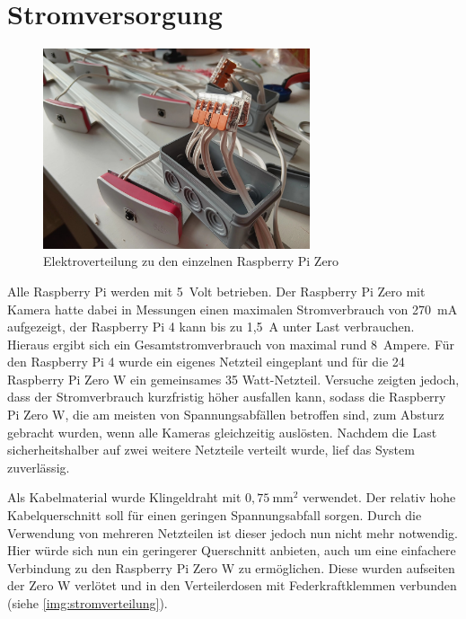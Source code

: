 \documentclass[./00PhotoBox.tex]{subfiles}
\begin{document}
\section{Stromversorgung}

\begin{figure}
    \centering
    \includegraphics[width=0.7\textwidth]{./img/stromverteilung.jpg}
    \caption{Elektroverteilung zu den einzelnen Raspberry Pi Zero} %
    \label{img:stromverteilung} %
\end{figure}

Alle Raspberry Pi werden mit 5~Volt betrieben. Der Raspberry Pi Zero mit Kamera hatte dabei in Messungen einen maximalen Stromverbrauch von 270~mA aufgezeigt, der Raspberry Pi 4 kann bis zu 1,5~A unter Last verbrauchen. Hieraus ergibt sich ein Gesamtstromverbrauch von maximal rund 8~Ampere. Für den Raspberry Pi 4 wurde ein eigenes Netzteil eingeplant und für die 24 Raspberry Pi Zero W ein gemeinsames 35 Watt-Netzteil. Versuche zeigten jedoch, dass der Stromverbrauch kurzfristig höher ausfallen kann, sodass die Raspberry Pi Zero W, die am meisten von Spannungsabfällen betroffen sind, zum Absturz gebracht wurden, wenn alle Kameras gleichzeitig auslösten. Nachdem die Last sicherheitshalber auf zwei weitere Netzteile verteilt wurde, lief das System zuverlässig.

Als Kabelmaterial wurde Klingeldraht mit $0,75~\text{mm}^2$ verwendet. Der relativ hohe Kabelquerschnitt soll für einen geringen Spannungsabfall sorgen. Durch die Verwendung von mehreren Netzteilen ist dieser jedoch nun nicht mehr notwendig. Hier würde sich nun ein geringerer Querschnitt anbieten, auch um eine einfachere Verbindung zu den Raspberry Pi Zero W zu ermöglichen. Diese wurden aufseiten der Zero W verlötet und in den Verteilerdosen mit Federkraftklemmen verbunden (siehe \autoref{img:stromverteilung}).
\end{document}
